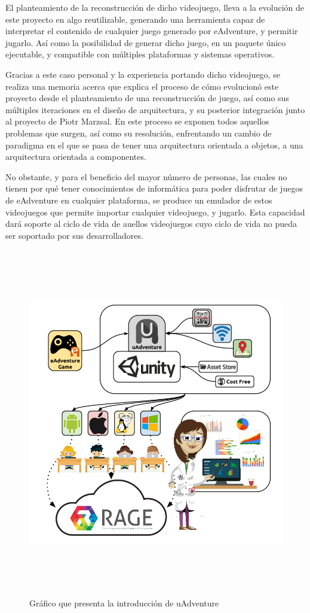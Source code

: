 El planteamiento de la reconstrucción de dicho videojuego, lleva a la evolución de este proyecto en algo reutilizable, generando una herramienta capaz de interpretar el contenido de cualquier juego generado por eAdventure, y permitir jugarlo. Así como la posibilidad de generar dicho juego, en un paquete único ejecutable, y compatible con múltiples plataformas y sistemas operativos.

Gracias a este caso personal y la experiencia portando dicho videojuego, se realiza una memoria acerca que explica el proceso de cómo evolucionó este proyecto desde el planteamiento de una reconstrucción de juego, así como sus múltiples iteraciones en el diseño de arquitectura, y su posterior integración junto al proyecto de Piotr Marzsal. En este proceso se exponen todos aquellos problemas que surgen, así como su resolución, enfrentando un cambio de paradigma en el que se pasa de tener una arquitectura orientada a objetos, a una arquitectura orientada a componentes.

No obstante, y para el beneficio del mayor número de personas, las cuales no tienen por qué tener conocimientos de informática para poder disfrutar de juegos de eAdventure en cualquier plataforma, se produce un emulador de estos videojuegos que permite importar cualquier videojuego, y jugarlo. Esta capacidad dará soporte al ciclo de vida de auellos videojuegos cuyo ciclo de vida no pueda ser soportado por sus desarrolladores.

\begin{figure}[htb]
	\centerline{\includegraphics[height=6in]{figures/uAdventuregrafico.png}}
	\caption[Introducción uAdventure]{Gráfico que presenta la introducción de uAdventure}
	\label{intrograph}
\end{figure}


